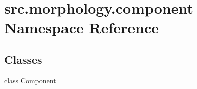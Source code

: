 \hypertarget{namespacesrc_1_1morphology_1_1component}{\section{src.\+morphology.\+component Namespace Reference}
\label{namespacesrc_1_1morphology_1_1component}
}
\subsection*{Classes}
\begin{DoxyCompactItemize}
\item 
class \hyperlink{classsrc_1_1morphology_1_1component_1_1_component}{Component}
\end{DoxyCompactItemize}

